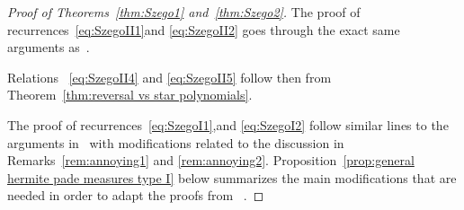 \documentclass[reqno,centertags,11pt,draft]{amsart}
\newtheorem{prop}[thm]{Proposition}
\begin{document}
\begin{proof}[Proof of Theorems~\ref{thm:Szego1} and~\ref{thm:Szego2}]
        The proof of recurrences~\eqref{eq:SzegoII1}and \eqref{eq:SzegoII2}
        goes through the exact same arguments as~\cite[Thm 3.1 and Cor 3.3]{KVMOPUC}. 

        Relations ~\eqref{eq:SzegoII4} and \eqref{eq:SzegoII5}
        follow then from Theorem~\ref{thm:reversal vs star polynomials}. 
        
        The proof of recurrences~\eqref{eq:SzegoI1},and \eqref{eq:SzegoI2}
        follow similar lines to the arguments in~\cite[Thm 4.3]{KVMOPUC} with modifications related to the discussion in Remarks~\ref{rem:annoying1} and \ref{rem:annoying2}. Proposition~\ref{prop:general hermite pade measures type I} below summarizes the main modifications that are needed in order to adapt the proofs from ~\cite[Sect. 4]{KVMOPUC}.
\end{proof}
\end{document}
